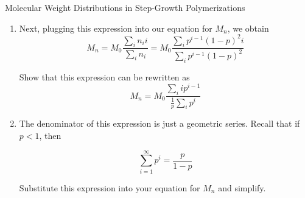 \begin{activity}{Molecular Weight Distributions in Step-Growth Polymerizations}
\begin{exercises}
\begin{enumerate}
\begin{solution}
{					}\end{solution}
					
					
				\item Next, plugging this expression into our equation for $M_n$, we obtain
					\begin{equation*}
						M_n = M_0 \frac{\sum_i n_i i}{\sum_i n_i} = M_0\frac{\sum_i p^{i-1}(1-p)^2 i }{\sum_i p^{i-1}(1-p)^2}
					\end{equation*}
					
					Show that this expression can be rewritten as
					\begin{equation*}
						M_n = M_0 \frac{{\sum_i i p^{i-1}}}{\frac{1}{p}\sum_i p^i}
					\end{equation*}
					
					\begin{solution}\end{solution}
					
				\item The denominator of this expression is just a geometric series.  Recall that if $p < 1$, then 
		
			\begin{equation*}
				\sum_{i=1}^{\infty} p^i = \frac{p}{1-p}
			\end{equation*}
			
					Substitute this expression into your equation for $M_n$ and simplify.
					
					\begin{solution}
\end{solution}
\end{enumerate}
\end{exercises}
\end{activity}
